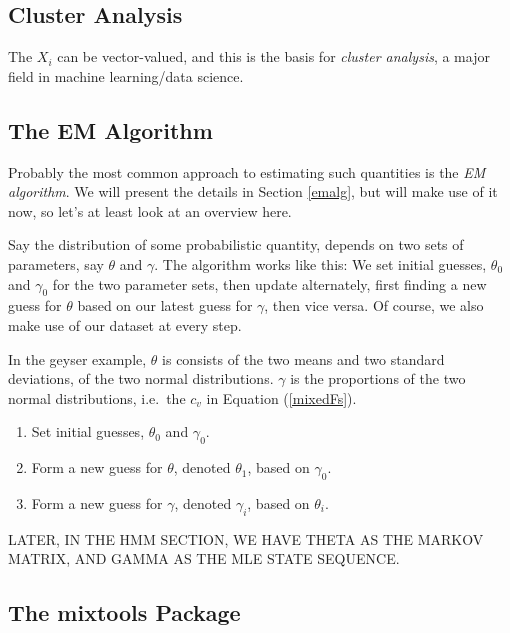 \documentclass[11pt]{article}
\begin{document}
\subsection{Cluster Analysis}

The $X_i$ can be vector-valued, and this is the basis for
\textit{cluster analysis}, a major field in machine learning/data
science.

\subsection{The EM Algorithm}

Probably the most common approach to estimating such quantities is the
\textit{EM algorithm}.  We will present the details in Section
\ref{emalg}, but will make use of it now, so let's at least look at an
overview here.

Say the distribution of some probabilistic quantity, depends on two sets
of parameters, say $\theta$ and $\gamma$.  The algorithm works like
this:  We set initial guesses, $\theta_0$ and $\gamma_0$ for the two
parameter sets, then update alternately, first finding a new guess for
$\theta$ based on our latest guess for $\gamma$, then vice versa.  Of
course, we also make use of our dataset at every step.

In the geyser example, $\theta$ is consists of the two means and two
standard deviations, of the two normal distributions.  $\gamma$ is the
proportions of the two normal distributions, i.e.\ the $c_v$ in Equation
(\ref{mixedFs}).

\begin{enumerate}

\item Set initial guesses, $\theta_0$ and $\gamma_0$.

\item Form a new guess for $\theta$, denoted $\theta_1$, based
on $\gamma_0$.

\item Form a new guess for $\gamma$, denoted $\gamma_i$, based
on $\theta_i$.

\end{enumerate} 

LATER, IN THE HMM SECTION, WE HAVE THETA AS THE MARKOV MATRIX, AND GAMMA
AS THE MLE STATE SEQUENCE.

\subsection{The mixtools Package}
\end{document}
